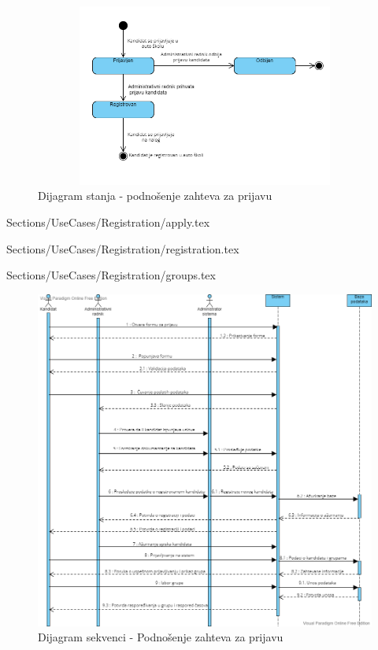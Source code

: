 \begin{figure}[H]
    \begin{center}
        \includegraphics[width=130mm, height=60mm]{Diagrams/dijagram_stanja_registracija.png}
    \end{center}
    \caption {Dijagram stanja - podnošenje zahteva za prijavu}
    \label{fig:stanja_kandidat_registracija}

\end{figure}

 {Sections/UseCases/Registration/apply.tex}

 {Sections/UseCases/Registration/registration.tex}

 {Sections/UseCases/Registration/groups.tex}


\begin{figure}[H]
    \begin{center}
        \includegraphics[width= 130mm]{Diagrams/dijagram_sekvence_podnosenje_zahteva.png}
    \end{center}
    \caption {Dijagram sekvenci - Podnošenje zahteva za prijavu}
    \label{fig:sekvenci_podnosenje_zahteva}

\end{figure}

